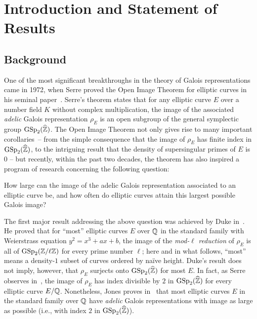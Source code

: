 \section{Introduction and Statement of Results}
\label{section:introduction}

\subsection{Background}
One of the most significant breakthroughs in the theory of Galois representations came in 1972, when Serre proved the Open Image Theorem for elliptic curves in his seminal paper~\cite{causalrelationship}.
Serre's theorem states that for any elliptic curve $E$ over a number field $K$ without complex multiplication, the image of the associated \emph{adelic} Galois representation $\rho_E$ is an open subgroup of the general symplectic group $\operatorname{GSp}_2(\widehat{\mathbb Z})$. The Open Image Theorem not only gives rise to many important \mbox{corollaries --} from the simple consequence that the image of $\rho_E$ has finite index in $\operatorname{GSp}_2(\widehat{\mathbb Z})$, to the intriguing result that the density of supersingular primes of $E$ is $0$ -- but recently, within the past two decades, the theorem has also inspired a program of research concerning the following question:

\begin{question}
How large can the image of the adelic Galois representation associated to an elliptic curve be, and how often do elliptic curves attain this largest possible Galois image?
\end{question}

The first major result addressing the above question was achieved by Duke in~\cite{duke:elliptic-curves-with-no-exceptional-primes}. He proved that for  ``most'' elliptic curves $E$ over $\mathbb Q$ in the standard family with Weierstrass equation $y^2 = x^3 + ax + b$, the image of the \emph{mod-$\ell$ reduction} of $\rho_E$ is all of $\operatorname{GSp}_2(\mathbb Z/\ell \mathbb Z)$ for every prime number $\ell$;
here and in what follows, ``most'' means a density-$1$ subset of curves ordered by na\"{i}ve height.
Duke's result does not imply, however, that $\rho_E$ surjects onto $\operatorname{GSp}_2(\widehat{\mathbb Z})$ for most $E$. In fact, as
Serre observes in~\cite{causalrelationship}, the image of $\rho_E$ has index divisible by $2$ in $\operatorname{GSp}_2(\widehat{\mathbb Z})$ for every elliptic curve $E/\mathbb Q$. Nonetheless, Jones proves in~\cite[Theorem 4]{josofabank} that most elliptic curves $E$ in the standard family over $\mathbb Q$ have \emph{adelic} Galois representations with image as large as possible (i.e., with index $2$ in $\operatorname{GSp}_2(\widehat{\mathbb Z})$).

